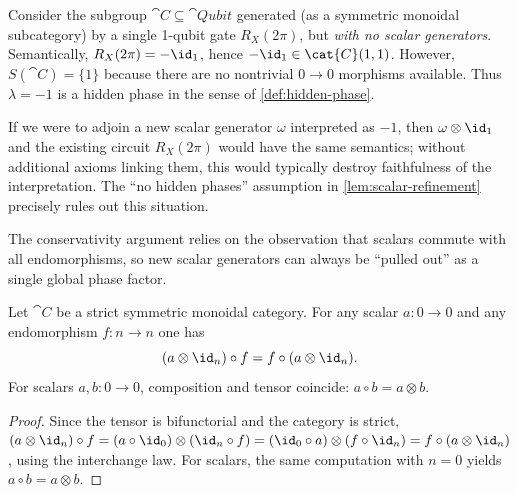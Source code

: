 \begin{example}\label{ex:hidden-phase}
Consider the subgroup $ \cat{C}\subseteq \cat{Qubit}$ generated (as a symmetric monoidal
subcategory) by a single 1-qubit gate $R_X(2\pi)$, but \emph{with no scalar generators}.
Semantically, $R_X(2\pi)=-\id_1$, hence $-\id_1\in \cat{C}(1,1)$.  However,
$S( \cat{C})=\{1\}$ because there are no nontrivial $0\to 0$ morphisms available.
Thus $\lambda=-1$ is a hidden phase in the sense of \cref{def:hidden-phase}.

If we were to adjoin a new scalar generator $\omega$ interpreted as $-1$, then $\omega\otimes\id_1$
and the existing circuit $R_X(2\pi)$ would have the same semantics; without additional axioms
linking them, this would typically destroy faithfulness of the interpretation.  The ``no hidden phases''
assumption in \cref{lem:scalar-refinement} precisely rules out this situation.
\end{example}


The conservativity argument relies on the observation that scalars commute with all endomorphisms,
so new scalar generators can always be ``pulled out'' as a single global phase factor.

\begin{lemma}\label{lem:scalar-centrality}
Let $ \cat{C}$ be a strict symmetric monoidal category.  For any scalar $a:0\to 0$ and any
endomorphism $f:n\to n$ one has
\begin{equation}\label{eq:scalar-centrality-app}
  (a\otimes \id_n)\circ f = f\circ (a\otimes \id_n).
\end{equation}
For scalars $a,b:0\to 0$, composition and tensor coincide:
\(
  a\circ b = a\otimes b.
\)
\end{lemma}
\begin{proof}
Since the tensor is bifunctorial and the category is strict,
\((a\otimes \id_n)\circ f
= (a\circ \id_0)\otimes(\id_n\circ f)
= (\id_0\circ a)\otimes(f\circ \id_n)
= f\circ(a\otimes \id_n)\), using the interchange law.
For scalars, the same computation with $n=0$ yields $a \circ b = a \otimes b$.
\end{proof}


